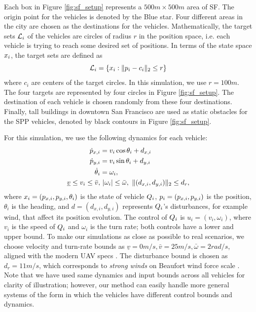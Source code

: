 Each box in Figure \ref{fig:sf_setup} represents a $500m \times 500m$ area of SF. The origin point for the vehicles is denoted by the Blue star. Four different areas in the city are chosen as the destinations for the vehicles. Mathematically, the target sets $\mathcal{L}_i$ of the vehicles are circles of radius $r$ in the position space, i.e. each vehicle is trying to reach some desired set of positions. In terms of the state space $x_i$, the target sets are defined as
\begin{equation}
\label{eq:target_sim}
\targetset_i = \{\state_i: \|\pos_i - c_i\|_2 \le r\}
\end{equation}
\noindent where $c_i$ are centers of the target circles. In this simulation, we use $r = 100m$. The four targets are represented by four circles in Figure \ref{fig:sf_setup}. The destination of each vehicle is chosen randomly from these four destinations. Finally, tall buildings in downtown San Francisco are used as static obstacles for the SPP vehicles, denoted by black contours in Figure \ref{fig:sf_setup}.

For this simulation, we use the following dynamics for each vehicle:
\begin{equation}
\label{eq:dyn_i}
\begin{aligned}
\dot{\pos}_{x,i} &= v_i \cos \theta_i + d_{x,i} \\
\dot{\pos}_{y,i} &= v_i \sin \theta_i + d_{y,i}\\
\dot{\theta}_i &= \omega_i, \\
\underline{v} \le v_i \le \bar{v}, & ~|\omega_i| \le \bar{\omega}, ~\|(d_{x,i}, d_{y,i}) \|_2 \le d_{r},
\end{aligned}
\end{equation}
\noindent where $x_i = (p_{x,i}, p_{y,i}, \theta_i)$ is the state of vehicle $Q_i$, $p_i = (p_{x,i}, p_{y,i})$ is the position, $\theta_i$ is the heading, and $d = (d_{x,i}, d_{y,i})$ represents $Q_i$'s disturbances, for example wind, that affect its position evolution. The control of $Q_i$ is $u_i = (v_i, \omega_i)$, where $v_i$ is the speed of $Q_i$ and $\omega_i$ is the turn rate; both controls have a lower and upper bound. To make our simulations as close as possible to real scenarios, we choose velocity and turn-rate bounds as $\underline{v} = 0m/s, \bar{v} = 25m/s, \bar\omega = 2 rad/s$, aligned with the modern UAV specs \cite{UAVspecs1, UAVspecs2}. The disturbance bound is chosen as $d_{r} = 11 m/s$, which corresponds to \textit{strong winds} on Beaufort wind force scale \cite{Windscale}. Note that we have used same dynamics and input bounds across all vehicles for clarity of illustration; however, our method can easily handle more general systems of the form in which the vehicles have different control bounds and dynamics.

